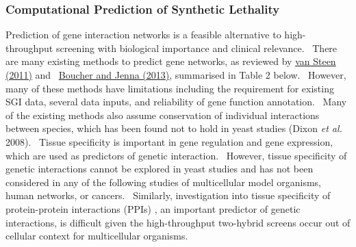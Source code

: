 \subsubsection[Computational Prediction of Synthetic Lethality]{Computational Prediction of Synthetic Lethality}

Prediction of gene interaction networks is a feasible alternative to high-throughput screening with biological importance and clinical relevance. \ There are many existing methods to predict gene networks, as reviewed by \hyperlink{ENREF104}{van Steen (2011)} and \ \hyperlink{ENREF16}{Boucher and Jenna (2013)}, summarised in Table 2 below. \ However, many of these methods have limitations including the requirement for existing SGI data, several data inputs, and reliability of gene function annotation. \ Many of the existing methods also assume conservation of individual interactions between species, which has been found not to hold in yeast studies (Dixon\textit{ et al.} 2008). \ Tissue specificity is important in gene regulation and gene expression, which are used as predictors of genetic interaction. \ However, tissue specificity of genetic interactions cannot be explored in yeast studies and has not been considered in any of the following studies of multicellular model organisms, human networks, or cancers. \ Similarly, investigation into tissue specificity of protein-protein interactions (PPIs) , an important predictor of genetic interactions, is difficult given the high-throughput two-hybrid screens occur out of cellular context for multicellular organisms. \  

